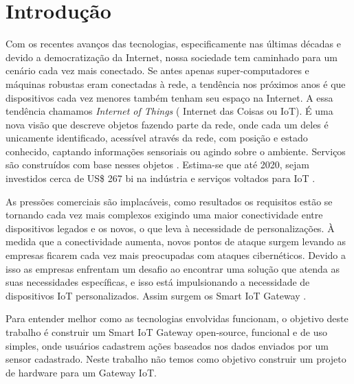 \section*{Introdução}
\label{sec:intro}

Com os recentes avanços das tecnologias, especificamente nas últimas décadas e devido a democratização da Internet, nossa sociedade tem caminhado para um cenário cada vez mais conectado. Se antes apenas super-computadores e máquinas robustas eram conectadas à rede, a tendência nos próximos anos é que dispositivos cada vez menores também tenham seu espaço na Internet.
A essa tendência chamamos \textit{Internet of Things} ( Internet das Coisas ou IoT). É uma nova visão que descreve objetos fazendo parte da rede, onde cada um deles é unicamente identificado, acessível através da rede, com posição e estado conhecido, captando informações sensoriais ou agindo sobre o ambiente. Serviços são construídos com base nesses objetos \cite{ComputerWorld}. Estima-se que até 2020, sejam investidos cerca de US\$ 267 bi na indústria e serviços voltados para IoT \cite{BCGPerspectives,Forbes}.

As pressões comerciais são implacáveis, como resultados os requisitos estão se tornando cada vez mais complexos exigindo uma maior conectividade entre dispositivos legados e os novos, o que leva à necessidade de personalizações. À medida que a conectividade aumenta, novos pontos de ataque surgem levando as empresas ficarem cada vez mais preocupadas com ataques cibernéticos. Devido a isso as empresas enfrentam um desafio ao encontrar uma solução que atenda as suas necessidades específicas, e isso está impulsionando a necessidade de dispositivos IoT personalizados. Assim surgem os Smart IoT Gateway \cite{EETAsia}. 

Para entender melhor como as tecnologias envolvidas funcionam, o objetivo deste trabalho é construir um Smart IoT Gateway open-source, funcional e de uso simples, onde usuários cadastrem ações baseados nos dados enviados por um sensor cadastrado. Neste trabalho não temos como objetivo construir um projeto de hardware para um Gateway IoT.
